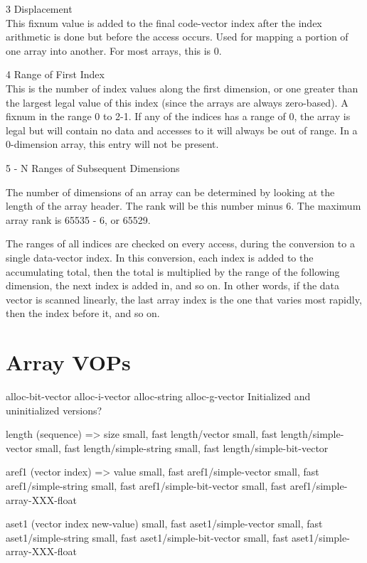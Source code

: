 {\begin{itemize, spread 0, spacing 1}
\begin{description}
3 Displacement \\This fixnum value is added to the final code-vector index
after the index arithmetic is done but before the access occurs.  Used for
mapping a portion of one array into another.  For most arrays, this is 0.

4 Range of First Index \\This is the number of index values along the first
dimension, or one greater than the largest legal value of this index (since the
arrays are always zero-based).	A fixnum in the range 0 to 2-1.  If any
of the indices has a range of 0, the array is legal but will contain no data
and accesses to it will always be out of range.  In a 0-dimension array, this
entry will not be present.

5 - N  Ranges of Subsequent Dimensions
\end{description}

The number of dimensions of an array can be determined by looking at the length
of the array header.  The rank will be this number minus 6.  The maximum array
rank is 65535 - 6, or 65529.

The ranges of all indices are checked on every access, during the conversion to
a single data-vector index.  In this conversion, each index is added to the
accumulating total, then the total is multiplied by the range of the following
dimension, the next index is added in, and so on.  In other words, if the data
vector is scanned linearly, the last array index is the one that varies most
rapidly, then the index before it, and so on.


\section{Array VOPs}

alloc-bit-vector
alloc-i-vector
alloc-string
alloc-g-vector
    Initialized and uninitialized versions?


length (sequence) => size
{small, fast} length/vector
{small, fast} length/simple-vector
{small, fast} length/simple-string
{small, fast} length/simple-bit-vector

aref1 (vector index) => value
{small, fast} aref1/simple-vector
{small, fast} aref1/simple-string
{small, fast} aref1/simple-bit-vector
{small, fast} aref1/simple-array-XXX-float

aset1 (vector index new-value)
{small, fast} aset1/simple-vector
{small, fast} aset1/simple-string
{small, fast} aset1/simple-bit-vector
{small, fast} aset1/simple-array-XXX-float


\end{itemize, spread 0, spacing 1}}
